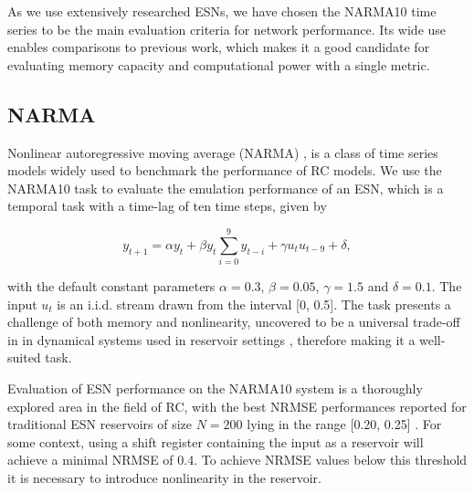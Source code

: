As we use extensively researched ESNs, we have chosen the NARMA10 time series to
be the main evaluation criteria for network performance. Its wide use enables
comparisons to previous work, which makes it a good candidate for evaluating
memory capacity and computational power with a single metric.

\subsection{NARMA}

Nonlinear autoregressive moving average (NARMA) \cite{atiya_new_2000},
\cite{kubota_dynamical_2019} is a class of time series models widely used to
benchmark the performance of RC models. We use the NARMA10 task to evaluate the
emulation performance of an ESN, which is a temporal task with a time-lag of ten
time steps, given by


\begin{equation}
  y_{t+1} = \alpha y_{t} +
  \beta y_{t} \sum_{i=0}^{9}y_{t-i} +
  \gamma u_{t}u_{t-9} +
  \delta,
  \label{narma}
\end{equation}

\noindent with the default constant parameters $\alpha = 0.3$, $\beta = 0.05$,
$\gamma = 1.5$ and $\delta = 0.1$. The input $u_{t}$ is an i.i.d. stream drawn
from the interval [0, 0.5]. The task presents a challenge of both memory and
nonlinearity, uncovered to be a universal trade-off in in dynamical systems used
in reservoir settings \cite{dambre_information_2012, verstraeten_memory_2010},
therefore making it a well-suited task.

Evaluation of ESN performance on the NARMA10 system is a thoroughly explored
area in the field of RC, with the best NRMSE performances reported for
traditional ESN reservoirs of size $N = 200$ lying in the range [0.20, 0.25]
\cite{goudarzi_comparative_2014, rodan_minimum_2011,
verstraeten_experimental_2007, jaeger_adaptive_nodate}. For some context, using
a shift register containing the input as a reservoir will achieve a minimal
NRMSE of 0.4. To achieve NRMSE values below this threshold it is necessary to
introduce nonlinearity in the reservoir.


